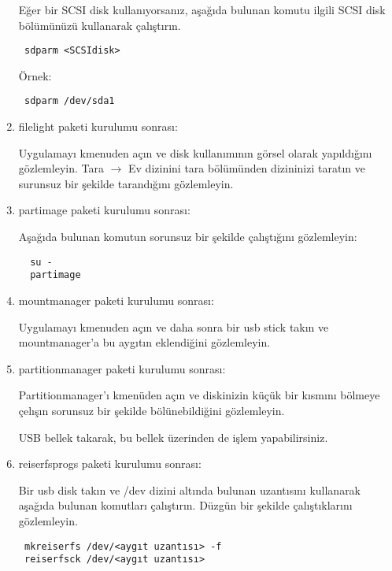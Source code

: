 \documentclass[a4paper,10pt]{article}
\begin{document}
\begin{enumerate}
Eğer bir SCSI disk kullanıyorsanız, aşağıda bulunan komutu ilgili SCSI disk bölümünüzü kullanarak çalıştırın.
\begin{verbatim}
 sdparm <SCSIdisk>
\end{verbatim}

Örnek:
\begin{verbatim}
 sdparm /dev/sda1
\end{verbatim}


\item filelight paketi kurulumu sonrası:

Uygulamayı kmenuden açın ve disk kullanımının görsel olarak yapıldığını gözlemleyin. Tara $\rightarrow$ Ev dizinini tara bölümünden dizininizi taratın ve surunsuz bir şekilde tarandığını gözlemleyin.
 \item partimage paketi kurulumu sonrası:

Aşağıda bulunan komutun sorunsuz bir şekilde çalıştığını gözlemleyin:
\begin{verbatim}
  su -
  partimage
\end{verbatim}

 \item mountmanager paketi kurulumu sonrası:

Uygulamayı kmenuden açın ve daha sonra bir usb stick takın ve mountmanager'a bu aygıtın eklendiğini gözlemleyin.
 \item partitionmanager paketi kurulumu sonrası:

Partitionmanager'ı kmenüden açın ve diskinizin küçük bir kısmını bölmeye çelışın sorunsuz bir şekilde bölünebildiğini gözlemleyin.

USB bellek takarak, bu bellek üzerinden de işlem yapabilirsiniz.

\item reiserfsprogs paketi kurulumu sonrası:

Bir usb disk takın ve /dev dizini altında bulunan uzantısını kullanarak aşağıda bulunan komutları çalıştırın. Düzgün bir şekilde çalıştıklarını gözlemleyin. 

\begin{verbatim}
 mkreiserfs /dev/<aygıt uzantısı> -f
 reiserfsck /dev/<aygıt uzantısı>
\end{verbatim}

\end{enumerate}
\end{document}
